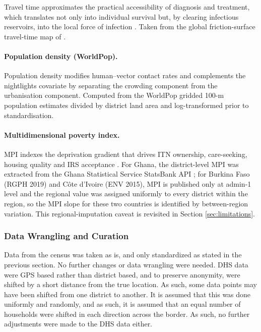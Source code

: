 \documentclass{article}
\begin{document}
Travel time approximates the practical accessibility of diagnosis and
treatment, which translates not only into individual survival but, by
clearing infectious reservoirs, into the local force of infection
\citep{weiss2020accessibility} . Taken from the global friction-surface
travel-time map of \citep{weiss2020accessibility}.

\paragraph{Population density (WorldPop).}

Population density modifies human--vector contact rates and complements
the nightlights covariate by separating the crowding component from the
urbanisation component. Computed from the WorldPop gridded 100-m
population estimates \citep{tatem2017worldpop} divided by district land
area and log-transformed prior to standardisation.

\paragraph{Multidimensional poverty index.}

MPI indexes the deprivation gradient that drives ITN ownership,
care-seeking, housing quality and IRS acceptance
\citep{tusting2017housing, tusting2019mapping}. For Ghana, the
district-level MPI was extracted from the Ghana Statistical Service
StatsBank API \citep{florey2014}; for Burkina Faso (RGPH 2019) and Côte
d'Ivoire (ENV 2015), MPI is published only at admin-1 level and the
regional value was assigned uniformly to every district within the
region, so the MPI slope for these two countries is identified by
between-region variation. This regional-imputation caveat is revisited
in Section \ref{sec:limitations}.

\subsubsection{Data Wrangling and
Curation}\label{data-wrangling-and-curation}

Data from the census was taken as is, and only standardized as stated in
the previous section. No further changes or data wrangling were needed.
DHS data were GPS based rather than district based, and to preserve
anonymity, were shifted by a short distance from the true location. As
such, some data points may have been shifted from one district to
another. It is assumed that this was done uniformly and randomly, and as
such, it is assumed that an equal number of households were shifted in
each direction across the border. As such, no further adjustments were
made to the DHS data either.
\end{document}
